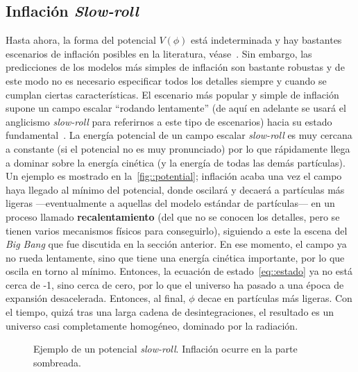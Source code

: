 \subsection{Inflación \textit{Slow-roll}}
Hasta ahora, la forma del potencial \(V(\phi)\) está indeterminada y hay bastantes escenarios de inflación posibles en la literatura, véase~\cite{liddle2000cosmological}. Sin embargo, las predicciones de los modelos más simples de inflación son bastante robustas y de este modo no es necesario especificar todos los detalles siempre y cuando se cumplan ciertas características. El escenario más popular y simple de inflación supone un campo escalar ``rodando lentamente'' (de aquí en adelante se usará el anglicismo \textit{slow-roll} para referirnos a este tipo de escenarios) hacia su estado fundamental~\cite{linde1982new,albrecht1982cosmology}. La energía potencial de un campo escalar \textit{slow-roll} es muy cercana a constante (si el potencial no es muy pronunciado) por lo que rápidamente llega a dominar sobre la energía cinética (y la energía de todas las demás partículas). Un ejemplo es mostrado en la~\autoref{fig::potential}; inflación acaba una vez el campo haya llegado al mínimo del potencial, donde oscilará y decaerá a partículas más ligeras ---eventualmente a aquellas del modelo estándar de partículas--- en un proceso llamado \textbf{recalentamiento} (del que no se conocen los detalles, pero se tienen varios mecanismos físicos para conseguirlo), siguiendo a este la escena del \textit{Big Bang} que fue discutida en la sección anterior. En ese momento, el campo ya no rueda lentamente, sino que tiene una energía cinética importante, por lo que oscila en torno al mínimo. Entonces, la ecuación de estado~\eqref{eq::estado} ya no está cerca de -1, sino cerca de cero, por lo que el universo ha pasado a una época de expansión desacelerada. Entonces, al final, \(\phi\) decae en partículas más ligeras. Con el tiempo, quizá tras una larga cadena de desintegraciones, el resultado es un universo casi completamente homogéneo, dominado por la radiación.
\begin{figure}[t]
    \centering
    \def\svgwidth{0.65\textwidth}
    
    \caption[Ejemplo de un potencial \textit{slow-roll}]{Ejemplo de un potencial \textit{slow-roll}. Inflación ocurre en la parte sombreada.}
    \label{fig::potential}
\end{figure}

